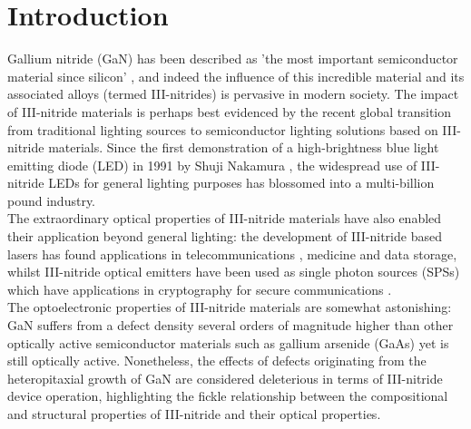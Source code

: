 
\chapter{Introduction}  %

\ifpdf
    \graphicspath{{Chapter1/Figs/Raster/}{Chapter1/Figs/PDF/}{Chapter1/Figs/}}
\else
    \graphicspath{{Chapter1/Figs/Vector/}{Chapter1/Figs/}}
\fi

Gallium nitride  (GaN) has been described as 'the most important semiconductor material since silicon' \cite{Humphreys2008}, and indeed the influence of this incredible material and its associated alloys (termed III-nitrides) is pervasive in modern society. The impact of III-nitride materials is perhaps best evidenced by the recent global transition from traditional lighting sources to semiconductor lighting solutions based on III-nitride materials. Since the first demonstration of a high-brightness blue light emitting diode  (LED) in 1991 by Shuji Nakamura \cite{Nakamura1991}, the widespread use of III-nitride LEDs for general lighting purposes has blossomed into a multi-billion pound industry.\\ The extraordinary optical properties of III-nitride materials have also enabled their application beyond general lighting: the development of III-nitride based lasers has found applications in telecommunications \cite{Najda2015}, medicine \cite{BerlienBreuerMuellerEtAl2012} and data storage, whilst III-nitride optical emitters have been used as single photon sources  (SPSs) which have applications in cryptography for secure communications \cite{Kako2006}.
\\The optoelectronic properties of III-nitride materials are somewhat astonishing: GaN suffers from a defect density several orders of magnitude higher than other optically active semiconductor materials such as gallium arsenide  (GaAs) \cite{Bennett2010b} yet is still optically active. Nonetheless, the effects of defects originating from the heteropitaxial growth of GaN are considered deleterious in terms of III-nitride device operation, highlighting the fickle relationship between the compositional and structural properties of III-nitride and their optical properties. 
